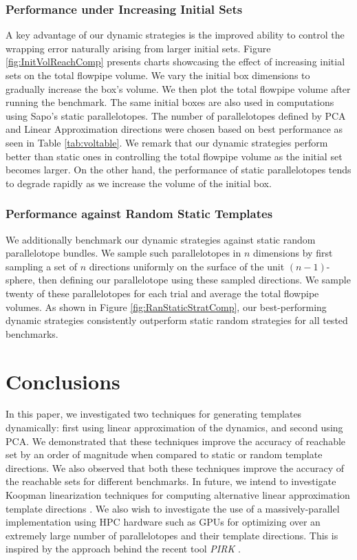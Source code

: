 \vspace{-1em}
\subsubsection{Performance under Increasing Initial Sets}
A key advantage of our dynamic strategies is the improved ability to control the wrapping error naturally arising from larger initial sets. Figure \ref{fig:InitVolReachComp} presents charts showcasing the effect of increasing initial sets on the total flowpipe volume. We vary the initial box dimensions to gradually increase the box's volume. We then plot the total flowpipe volume after running the benchmark. The same initial boxes are also used in computations using Sapo's static parallelotopes. The number of parallelotopes defined by PCA and Linear Approximation directions were chosen based on best performance as seen in Table \ref{tab:voltable}. We remark that our dynamic strategies perform better than static ones in controlling the total flowpipe volume as the initial set becomes larger. On the other hand, the performance of static parallelotopes tends to degrade rapidly as we increase the volume of the initial box.

\vspace{-1em}
\subsubsection{Performance against Random Static Templates}
We additionally benchmark our dynamic strategies against static random parallelotope bundles. We sample such parallelotopes in $n$ dimensions by first sampling a set of $n$ directions uniformly on the surface of the unit $(n-1)$-sphere, then defining our parallelotope using these sampled directions. We sample twenty of these parallelotopes for each trial and average the total flowpipe volumes. As shown in Figure \ref{fig:RanStaticStratComp}, our best-performing dynamic strategies consistently outperform static random strategies for all tested benchmarks.

\vspace{-0.8em}
\section{Conclusions}
In this paper, we investigated two techniques for generating templates dynamically: first using linear approximation of the dynamics, and second using PCA.
%
We demonstrated that these techniques improve the accuracy of reachable set by an order of magnitude when compared to static or random template directions.
%
We also observed that both these techniques improve the accuracy of the reachable sets for different benchmarks.
%
In future, we intend to investigate Koopman linearization techniques for computing alternative linear approximation template directions \cite{bak2021reachability}.
%
We also wish to investigate the use of a massively-parallel implementation using HPC hardware such as GPUs for optimizing over an extremely large number of parallelotopes and their template directions. This is inspired by the approach behind the recent tool \emph{PIRK} \cite{devonport2020pirk}.

